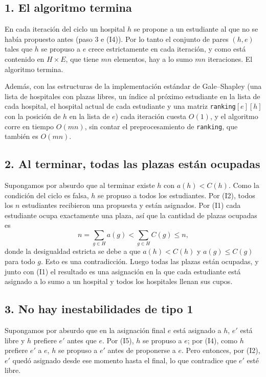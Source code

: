 \subsection*{1. El algoritmo termina}
En cada iteración del ciclo un hospital $h$ se propone a un estudiante al que no se había
propuesto antes (paso 3 e (I4)). Por lo tanto el conjunto de pares $(h,e)$ tales que $h$ se
propuso a $e$ crece estrictamente en cada iteración, y como está contenido en $H\times E$, que
tiene $mn$ elementos, hay a lo sumo $mn$ iteraciones. El algoritmo termina.

Además, con las estructuras de la implementación estándar de Gale--Shapley (una lista de
hospitales con plazas libres, un índice al próximo estudiante en la lista de cada hospital, el
hospital actual de cada estudiante y una matriz \texttt{ranking}$[e][h]$ con la posición de $h$
en la lista de $e$) cada iteración cuesta $O(1)$, y el algoritmo corre en tiempo $O(mn)$, sin
contar el preprocesamiento de \texttt{ranking}, que también es $O(mn)$.

\subsection*{2. Al terminar, todas las plazas están ocupadas}
Supongamos por absurdo que al terminar existe $h$ con $a(h)<C(h)$. Como la condición del ciclo
es falsa, $h$ se propuso a todos los estudiantes. Por (I2), todos los $n$ estudiantes recibieron
una propuesta y están asignados. Por (I1) cada estudiante ocupa exactamente una plaza, así que
la cantidad de plazas ocupadas es
\[
n=\sum_{g\in H} a(g) < \sum_{g\in H} C(g)\le n,
\]
donde la desigualdad estricta se debe a que $a(h)<C(h)$ y $a(g)\le C(g)$ para todo $g$. Esto es
una contradicción. Luego todas las plazas están ocupadas, y junto con (I1) el resultado es una
asignación en la que cada estudiante está asignado a lo sumo a un hospital y todos los
hospitales llenan sus cupos.

\subsection*{3. No hay inestabilidades de tipo 1}
Supongamos por absurdo que en la asignación final $e$ está asignado a $h$, $e'$ está libre y
$h$ prefiere $e'$ antes que $e$. Por (I5), $h$ se propuso a $e$; por (I4), como $h$ prefiere
$e'$ a $e$, $h$ se propuso a $e'$ antes de proponerse a $e$. Pero entonces, por (I2), $e'$ quedó
asignado desde ese momento hasta el final, lo que contradice que $e'$ esté libre.

